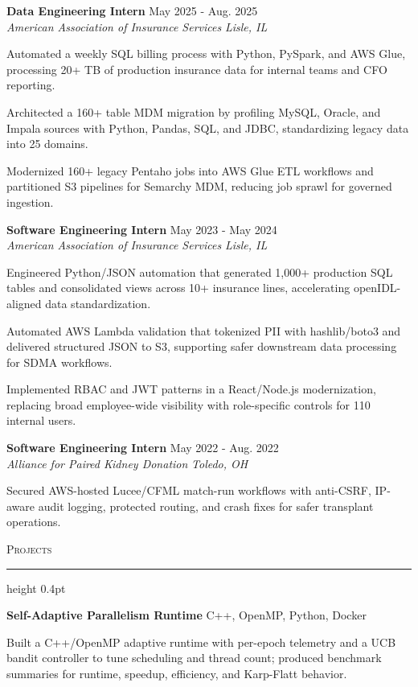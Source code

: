 \documentclass[letterpaper,11pt]{article}
\newcommand{\resumesection}[1]{%
  \par\vspace{2pt}%
  {\large\scshape #1}\par\vspace{2pt}%
  \hrule height 0.4pt\vspace{2pt}%
}
\newcommand{\resumeSubheading}[4]{
  \textbf{#1} \hfill #2\\
  \textit{#3} \hfill \textit{#4}
}
\newcommand{\projectHeading}[2]{
  \textbf{#1} \hfill #2
}
\begin{document}
\resumeSubheading
{Data Engineering Intern}{May 2025 - Aug. 2025}
{American Association of Insurance Services}{Lisle, IL}
\begin{tightitemize}
  \item Automated a weekly SQL billing process with Python, PySpark, and AWS Glue, processing 20+ TB of production insurance data for internal teams and CFO reporting.
  \item Architected a 160+ table MDM migration by profiling MySQL, Oracle, and Impala sources with Python, Pandas, SQL, and JDBC, standardizing legacy data into 25 domains.
  \item Modernized 160+ legacy Pentaho jobs into AWS Glue ETL workflows and partitioned S3 pipelines for Semarchy MDM, reducing job sprawl for governed ingestion.
\end{tightitemize}

\resumeSubheading
{Software Engineering Intern}{May 2023 - May 2024}
{American Association of Insurance Services}{Lisle, IL}
\begin{tightitemize}
  \item Engineered Python/JSON automation that generated 1,000+ production SQL tables and consolidated views across 10+ insurance lines, accelerating openIDL-aligned data standardization.
  \item Automated AWS Lambda validation that tokenized PII with hashlib/boto3 and delivered structured JSON to S3, supporting safer downstream data processing for SDMA workflows.
  \item Implemented RBAC and JWT patterns in a React/Node.js modernization, replacing broad employee-wide visibility with role-specific controls for 110 internal users.
\end{tightitemize}

\resumeSubheading
{Software Engineering Intern}{May 2022 - Aug. 2022}
{Alliance for Paired Kidney Donation}{Toledo, OH}
\begin{tightitemize}
  \item Secured AWS-hosted Lucee/CFML match-run workflows with anti-CSRF, IP-aware audit logging, protected routing, and crash fixes for safer transplant operations.
\end{tightitemize}

\resumesection{Projects}
\projectHeading{Self-Adaptive Parallelism Runtime}{C++, OpenMP, Python, Docker}
\begin{tightitemize}
  \item Built a C++/OpenMP adaptive runtime with per-epoch telemetry and a UCB bandit controller to tune scheduling and thread count; produced benchmark summaries for runtime, speedup, efficiency, and Karp-Flatt behavior.
\end{tightitemize}
\end{document}
